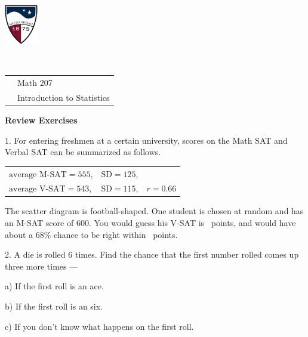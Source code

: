 \documentclass[10pt]{article}
\begin{document}
\pagestyle{empty}
\lstset{language=R, showspaces=false, showstringspaces=false}
\href{http://www.su.edu}{\includegraphics[height=1.75cm]{sulogo.eps}}
\vspace{-1.79cm}

{{\ }\hfill\small
\begin{tabular}{cl}
& Math 207\\
& Introduction to Statistics\\
\end{tabular}
}

\setlength{\baselineskip}{1.1\baselineskip}
\bigskip

\newcommand{\BL}{\underbar{\hspace{.5in}}}
\begin{center}
\textbf{\large Review Exercises}
\end{center}
1. For entering freshmen at a certain university, scores on the 
Math SAT and Verbal SAT can be summarized as follows.\vspace{-4pt}
\begin{center}
\begin{tabular}{lll}
$\mbox{average M-SAT} = 555$, & $\mbox{SD}=125$, & \\
$\mbox{average V-SAT} = 543$, & $\mbox{SD}=115$, & $r=0.66$\vspace{-4pt}
\end{tabular}
\end{center}
The scatter diagram is football-shaped.  One student is chosen at random and has
an M-SAT score of 600. You would guess his V-SAT is \BL\ points,
and would have about a 68\% chance to be right within \BL\ points.
\vspace{1.25in}


2. A die is rolled 6 times.  Find the chance that the first number
rolled comes up three more times ---

\hspace{20pt} a) If the first roll is an ace.
\vspace{.7in}

\hspace{20pt} b) If the first roll is an six.
\vspace{.7in}

\hspace{20pt} c) If you don't know what happens on the first roll.
\vspace{1in}
\end{document}
